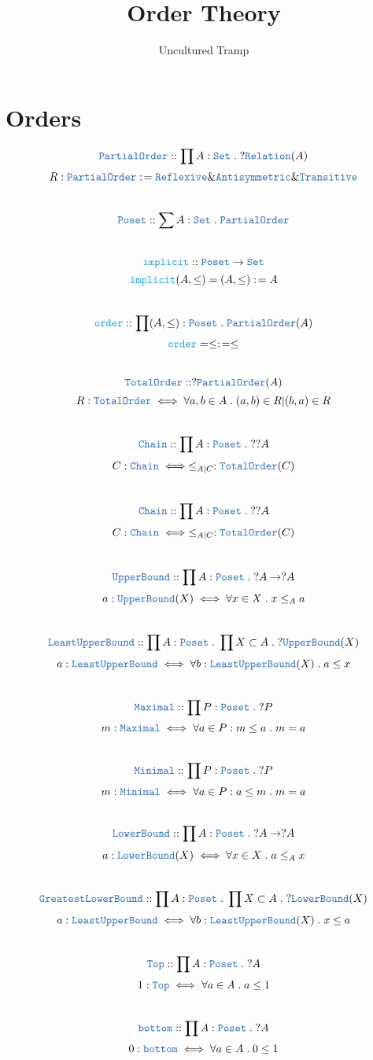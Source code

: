\documentclass[12pt]{article}
\author{Uncultured Tramp}
\title{Order Theory}
\newcommand{\TYPE}[1]{\textcolor{NavyBlue}{\mathtt{#1}}}
\newcommand{\FUNC}[1]{\textcolor{Cerulean}{\mathtt{#1}}}
\renewcommand{\.}{\; . \;}
\newcommand{\de}{: \kern 0.1pc =}
\newcommand{\Set}{\TYPE{Set}}
\begin{document}
\maketitle
\begin{center}
\end{center}
\tableofcontents
\newpage
\section{Orders}
$$\TYPE{PartialOrder} :: \prod A : \Set \. ?\TYPE{Relation}(A)$$
$$ R : \TYPE{PartialOrder} \de  \TYPE{Reflexive} \& \TYPE{Antisymmetric} \& \TYPE{Transitive}  $$
\\ 
$$\TYPE{Poset} :: \sum A : \Set \. \TYPE{PartialOrder}   $$
\\ 
$$\FUNC{implicit} :: \TYPE{Poset} \to \Set   $$
$$ \FUNC{implicit} (A, \le) =  (A, \le) \de A $$
\\
$$
\FUNC{order} :: \prod (A, \le) : \TYPE{Poset} \. \TYPE{PartialOrder}(A)
$$
$$
 \FUNC{order} = \le \de \le
$$
\\
$$
\TYPE{TotalOrder} :: ?\TYPE{PartialOrder}(A) $$
$$
 R : \TYPE{TotalOrder} \iff \forall a,b \in A \. (a,b) \in R | (b,a) \in R
$$
\\
$$
\TYPE{Chain} :: \prod A : \TYPE{Poset} \. ??A
$$
$$
C : \TYPE{Chain} \iff \le_{A|C} : \TYPE{TotalOrder}(C)
$$
\\
$$
\TYPE{Chain} :: \prod A : \TYPE{Poset} \. ??A
$$
$$
C : \TYPE{Chain} \iff \le_{A|C} : \TYPE{TotalOrder}(C)
$$
\\
$$
\TYPE{UpperBound} :: \prod A : \TYPE{Poset} \. ?A \to ?A
$$
$$
a : \TYPE{UpperBound}(X) \iff \forall x \in X \. x \le_A a 
$$
\\
$$
\TYPE{LeastUpperBound} :: \prod A : \TYPE{Poset} \. \prod X \subset A \.  ?\TYPE{UpperBound}(X)
$$
$$
a : \TYPE{LeastUpperBound} \iff \forall b :   \TYPE{LeastUpperBound}(X) \. a \le x 
$$
\\
$$
\TYPE{Maximal} :: \prod P : \TYPE{Poset} \. ?P 
$$
$$
m : \TYPE{Maximal} \iff \forall a \in P : m \le a \. m = a
$$
\\
$$
\TYPE{Minimal} :: \prod P : \TYPE{Poset} \. ?P 
$$
$$
m : \TYPE{Minimal} \iff \forall a \in P : a \le m \. m = a
$$
\\
$$
\TYPE{LowerBound} :: \prod A : \TYPE{Poset} \. ?A \to ?A
$$
$$
a : \TYPE{LowerBound}(X) \iff \forall x \in X \. a \le_A x 
$$
\\
$$
\TYPE{GreatestLowerBound} :: \prod A : \TYPE{Poset} \. \prod X \subset A \.  ?\TYPE{LowerBound}(X)
$$
$$
a : \TYPE{LeastUpperBound} \iff \forall b :   \TYPE{LeastUpperBound}(X) \. x \le a 
$$
\\
$$
\TYPE{Top} :: \prod A : \TYPE{Poset} \. ?A\\
$$
$$
1 : \TYPE{Top} \iff \forall a \in A \. a \le 1 
$$
\\
$$
\TYPE{bottom} :: \prod A : \TYPE{Poset} \. ?A\\
$$
$$
0 : \TYPE{bottom} \iff \forall a \in A \. 0 \le 1 
$$
\newpage
\end{document}
